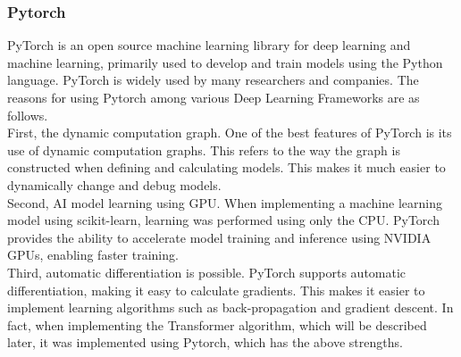 \subsubsection{\textbf{Pytorch}}
PyTorch is an open source machine learning library for deep learning and machine learning, primarily used to develop and train models using the Python language. PyTorch is widely used by many researchers and companies. The reasons for using Pytorch among various Deep Learning Frameworks are as follows.
\\

First, the dynamic computation graph. One of the best features of PyTorch is its use of dynamic computation graphs. This refers to the way the graph is constructed when defining and calculating models. This makes it much easier to dynamically change and debug models.
\\

Second, AI model learning using GPU. When implementing a machine learning model using scikit-learn, learning was performed using only the CPU. PyTorch provides the ability to accelerate model training and inference using NVIDIA GPUs, enabling faster training. 
\\

Third, automatic differentiation is possible. PyTorch supports automatic differentiation, making it easy to calculate gradients. This makes it easier to implement learning algorithms such as back-propagation and gradient descent. In fact, when implementing the Transformer algorithm, which will be described later, it was implemented using Pytorch, which has the above strengths.\\

